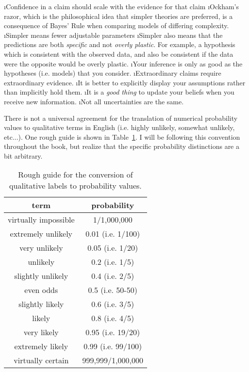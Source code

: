 \bi
\i Confidence in a claim should scale with the evidence for that claim
\i Ockham's razor, which is the philosophical idea that simpler theories are preferred, is a consequence of Bayes' Rule when comparing models of differing complexity.
\i Simpler means fewer adjustable parameters
\i Simpler also means that the predictions are both {\em specific} and not {\em overly plastic}. For example, a hypothesis which is consistent with the observed data, and also be consistent if the data were the opposite would be overly plastic.
\i Your inference is only as good as the hypotheses (i.e. models) that you consider.
\i Extraordinary claims require extraordinary evidence.\cite{sagandemon}
\i It is better to explicitly display your assumptions rather than implicitly hold them.
\i It is a {\em good thing} to update your beliefs when you receive new information.
\i Not all uncertainties are the same.
\ei


There is not a universal agreement for the translation of numerical probability values to qualitative terms in English (i.e. highly unlikely, somewhat unlikely, etc...).  One rough guide is shown in Table~\ref{table1}.  I will be following this convention throughout the book, but realize that the specific probability distinctions are a bit arbitrary.




\begin{table}
\begin{tabular}{cc}
term & probability \\\hline\hline
virtually impossible & 1/1,000,000\\
extremely unlikely & 0.01 (i.e. 1/100) \\
very unlikely & 0.05 (i.e. 1/20) \\
unlikely & 0.2 (i.e. 1/5) \\
slightly unlikely & 0.4 (i.e. 2/5) \\
even odds & 0.5 (i.e. 50-50) \\
slightly likely & 0.6 (i.e. 3/5) \\
likely & 0.8 (i.e. 4/5) \\
very likely & 0.95 (i.e. 19/20) \\
extremely likely & 0.99 (i.e. 99/100) \\
virtually certain & 999,999/1,000,000
\end{tabular}
\label{table1}
\caption{Rough guide for the conversion of qualitative labels to probability values. }
\end{table}


